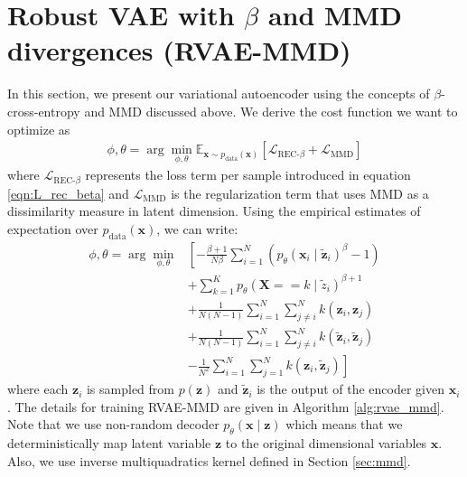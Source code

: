 \documentclass{article}
\def\bx{\mathbf{x}}
\def\bX{\mathbf{X}}
\def\bz{\mathbf{z}}
\theoremstyle{plain}
\theoremstyle{definition}
\begin{document}
\section{Robust VAE with $\beta$ and MMD divergences (RVAE-MMD)}
\label{sec:proposed_approach}
In this section, we present our variational autoencoder using the concepts of $\beta$-cross-entropy and MMD discussed above. We derive the cost function we want to optimize as
\begin{equation}
\begin{split}
\phi, \theta = \arg \min_{\phi, \theta} \mathbb{E}_{\bx \sim p_{\textrm{data}}(\bx)} \left[ \mathcal{L}_{\textrm{REC-}\beta} + \mathcal{L}_{\textrm{MMD}} \right]
\end{split}
\end{equation}
where $\mathcal{L}_{\textrm{REC-}\beta}$ represents the loss term per sample introduced in equation \ref{eqn:L_rec_beta} and $ \mathcal{L}_{\textrm{MMD}}$ is the regularization term that uses MMD as a dissimilarity measure in latent dimension. Using the empirical estimates of expectation over $p_{\textrm{data}}(\bx)$,  we can write:
\begin{equation}
\begin{split}
\phi, \theta = \arg \min_{\phi, \theta} & \left[ - \frac{\beta+1}{N \beta} \sum_{i=1}^N \left( p_{\theta}(\bx_i \mid \tilde{\bz}_i)^{\beta} - 1 \right)  \right. \\ 
& +  \sum_{k=1}^K p_{\theta}(\bX == k \mid \tilde{z}_i)^{\beta+1} \\
& + \frac{1}{N(N-1)} \sum_{i=1}^N \sum_{j \neq i}^N k(\bz_i, \bz_j) \\
&+ \frac{1}{N(N-1)} \sum_{i=1}^N \sum_{j \neq i}^N k(\tilde{\bz}_i, \tilde{\bz}_j) \\
& - \left. \frac{1}{N^2}  \sum_{i=1}^N   \sum_{j=1}^N  k(\bz_i, \tilde{\bz}_j) \right]
\end{split}
\end{equation}
where each $\bz_i$ is sampled from $p(\bz)$ and $\tilde{\bz}_i$ is the output of the encoder given $\bx_i$. The details for training RVAE-MMD are given in Algorithm \ref{alg:rvae_mmd}. Note that we use non-random decoder $p_{\theta}(\bx \mid \bz)$ which means that we deterministically map latent variable $\bz$ to the original dimensional variables $\bx$. Also, we use inverse multiquadratics kernel defined in Section \ref{sec:mmd}.
\end{document}
